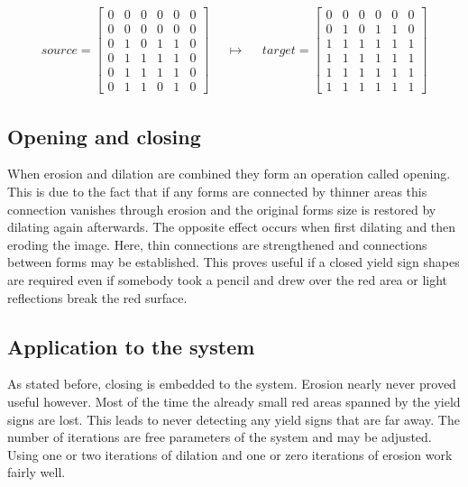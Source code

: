 \documentclass{report}
\begin{document}
\begin{align}\label{eq:morph_dilation-example}
  source = \begin{bmatrix}
    0 & 0 & 0 & 0 & 0 & 0 \\
    0 & 0 & 0 & 0 & 0 & 0 \\
    0 & 1 & 0 & 1 & 1 & 0 \\
    0 & 1 & 1 & 1 & 1 & 0 \\
    0 & 1 & 1 & 1 & 1 & 0 \\
    0 & 1 & 1 & 0 & 1 & 0
  \end{bmatrix}
  & &
  \mapsto
  & &
  target = \begin{bmatrix}
    0 & 0 & 0 & 0 & 0 & 0 \\
    0 & 1 & 0 & 1 & 1 & 0 \\
    1 & 1 & 1 & 1 & 1 & 1 \\
    1 & 1 & 1 & 1 & 1 & 1 \\
    1 & 1 & 1 & 1 & 1 & 1 \\
    1 & 1 & 1 & 1 & 1 & 1
  \end{bmatrix}
\end{align}


\subsection{Opening and closing}

When erosion and dilation are combined they form an operation called
opening. This is due to the fact that if any forms are connected by
thinner areas this connection vanishes through erosion and the
original forms size is restored by dilating again afterwards. The
opposite effect occurs when first dilating and then eroding the
image. Here, thin connections are strengthened and connections between
forms may be established. This proves useful if a closed yield sign
shapes are required even if somebody took a pencil and drew over the
red area or light reflections break the red surface.


\subsection{Application to the system}

As stated before, closing is embedded to the system. Erosion nearly
never proved useful however. Most of the time the already small red
areas spanned by the yield signs are lost. This leads to never
detecting any yield signs that are far away. The number of iterations
are free parameters of the system and may be adjusted. Using one or
two iterations of dilation and one or zero iterations of erosion work
fairly well.
\end{document}
